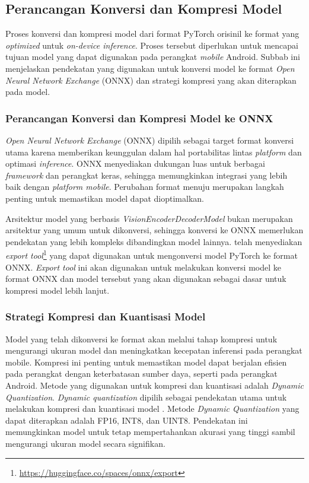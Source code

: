 \subsection{Perancangan Konversi dan Kompresi Model}
\label{subsec:perancangan-konversi-dan-kompresi-model}

 Proses konversi dan kompresi model \donut{} dari format PyTorch orisinil ke format yang \emph{optimized} untuk \emph{on-device inference}. Proses tersebut diperlukan untuk mencapai tujuan model yang dapat digunakan pada perangkat \emph{mobile} Android. Subbab ini menjelaskan pendekatan yang digunakan untuk konversi model ke format \emph{Open Neural Network Exchange} (ONNX) dan strategi kompresi yang akan diterapkan pada model.

\subsubsection{Perancangan Konversi dan Kompresi Model \donut{} ke ONNX}
\label{subsubsec:strategi-konversi-onnx}

\emph{Open Neural Network Exchange} (ONNX) dipilih sebagai target format konversi utama karena memberikan keunggulan dalam hal portabilitas lintas \emph{platform} dan optimasi \emph{inference}. ONNX menyediakan dukungan luas untuk berbagai \emph{framework} dan perangkat keras, sehingga memungkinkan integrasi yang lebih baik dengan \emph{platform mobile}. Perubahan format menuju \onnx{} merupakan langkah penting untuk memastikan model dapat dioptimalkan.

Arsitektur model \donut{} yang berbasis \textit{VisionEncoderDecoderModel} bukan merupakan arsitektur yang umum untuk dikonversi, sehingga konversi ke ONNX memerlukan pendekatan yang lebih kompleks dibandingkan model lainnya. \onnx{} telah menyediakan \emph{export tool}{}\footnote{\url{https://huggingface.co/spaces/onnx/export}} yang dapat digunakan untuk mengonversi model PyTorch ke format ONNX. \emph{Export tool} ini akan digunakan untuk melakukan konversi model \donut{} ke format ONNX dan model tersebut yang akan digunakan sebagai dasar untuk kompresi model lebih lanjut. 

\subsubsection{Strategi Kompresi dan Kuantisasi Model}
\label{subsubsec:strategi-kompresi-dan-kuantisasi-model}

Model \donut{} yang telah dikonversi ke format \onnx{} akan melalui tahap kompresi untuk mengurangi ukuran model dan meningkatkan kecepatan inferensi pada perangkat mobile. Kompresi ini penting untuk memastikan model dapat berjalan efisien pada perangkat dengan keterbatasan sumber daya, seperti pada perangkat Android. Metode yang digunakan untuk kompresi dan kuantisasi adalah \emph{Dynamic Quantization}. \emph{Dynamic quantization} dipilih sebagai pendekatan utama untuk melakukan kompresi dan kuantisasi model \donut. Metode \emph{Dynamic Quantization} yang dapat diterapkan adalah FP16, INT8, dan UINT8. Pendekatan ini memungkinkan model untuk tetap mempertahankan akurasi yang tinggi sambil mengurangi ukuran model secara signifikan.
